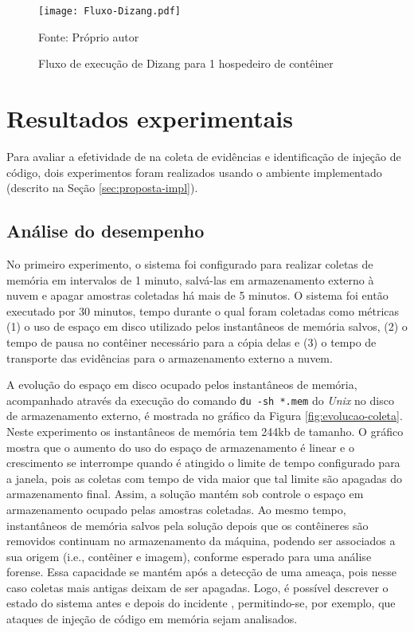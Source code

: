 \begin{figure}[htb!]
\footnotesize
\caption{Fluxo de execução de Dizang para 1 hospedeiro de contêiner}
\texttt{[image: Fluxo-Dizang.pdf]}
\centering
\label{fig:fluxo-dizang}
\begin{center}
Fonte: Próprio autor 
\end{center}
\end{figure}


\section{Resultados experimentais}
\label{sec:proposta-exp}

Para avaliar a efetividade de \fancyname na coleta de evidências e identificação de injeção de código, dois experimentos foram realizados usando o ambiente implementado (descrito na Seção \ref{sec:proposta-impl}).
%


\subsection{Análise do desempenho}
\label{sec:proposta-exp-desempenho}

No primeiro experimento, o sistema foi configurado para realizar coletas de memória em intervalos de 1 minuto, salvá-las em armazenamento externo à nuvem e apagar amostras coletadas há mais de 5 minutos. 
%
O sistema foi então executado por 30 minutos, tempo durante o qual foram coletadas como métricas (1) o uso de espaço em disco utilizado pelos instantâneos de memória salvos, (2) o tempo de pausa no contêiner necessário para a cópia delas e (3) o tempo de transporte das evidências para o armazenamento externo a nuvem.


A evolução do espaço em disco ocupado pelos instantâneos de memória, acompanhado através da execução do comando \texttt{du -sh *.mem} do \textit{Unix} no disco de armazenamento externo, é mostrada no gráfico da Figura \ref{fig:evolucao-coleta}.
%
Neste experimento os instantâneos de memória tem 244kb de tamanho. 
%
O gráfico mostra que o aumento do uso do espaço de armazenamento é linear e o crescimento se interrompe quando é atingido o limite de tempo configurado para a janela, pois as coletas com tempo de vida maior que tal limite são apagadas do armazenamento final. 
%
Assim, a solução mantém sob controle o espaço em armazenamento ocupado pelas amostras coletadas.
%
Ao mesmo tempo, instantâneos de memória salvos pela solução depois que os contêineres são removidos continuam no armazenamento da máquina, podendo ser associados a sua origem (i.e., contêiner e imagem), conforme esperado para uma análise forense.
%
Essa capacidade se mantém após a detecção de uma ameaça, pois nesse caso coletas mais antigas deixam de ser apagadas.
%
Logo, é possível descrever o estado do sistema antes e depois do incidente \cite{CaseMemoryForensics:2014}, permitindo-se, por exemplo, que ataques de injeção de código em memória sejam analisados.
%

